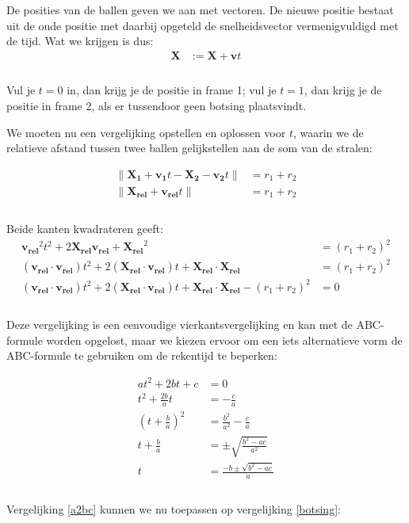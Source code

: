 \documentclass[12pt,a4paper]{article}
\begin{document}
	De posities van de ballen geven we aan met vectoren. De nieuwe positie bestaat uit de oude positie met daarbij opgeteld de snelheidsvector vermenigvuldigd met de tijd. Wat we krijgen is dus:
	\begin{equation}
		\begin{aligned}
			\mathbf{X} &:= \mathbf{X} + \mathbf{v}t\\
		\end{aligned}
	\end{equation}
	\\Vul je $t=0$ in, dan krijg je de positie in frame 1; vul je $t=1$, dan krijg je de positie in frame 2, als er tussendoor geen botsing plaatsvindt.
	
	We moeten nu een vergelijking opstellen en oplossen voor $t$, waarin we de relatieve afstand tussen twee ballen gelijkstellen aan de som van de stralen:
	
	\begin{equation}
		\begin{aligned}
			 \|\mathbf{X_1} + \mathbf{v_1}t  - \mathbf{X_2} -  \mathbf{v_2}t \| &= r_1 + r_2 \\
			 \|\mathbf{X_{rel}} + \mathbf{v_{rel}}t \| &= r_1 + r_2\\
		\end{aligned}
	\end{equation}
	\\Beide kanten kwadrateren geeft:
	\begin{equation}
		\label{botsing}
		\begin{aligned}
			\mathbf{v_{rel}}^2 t^2 + 2 \mathbf{X_{rel}} \mathbf{v_{rel}} + \mathbf{X_{rel}}^2  &= (r_1 + r_2)^2 \\
			(\mathbf{v_{rel}} \cdot \mathbf{v_{rel}})t^2 + 2(\mathbf{X_{rel}} \cdot \mathbf{v_{rel}})t + \mathbf{X_{rel}} \cdot \mathbf{X_{rel}} &= (r_1 + r_2)^2 \\
			(\mathbf{v_{rel}} \cdot \mathbf{v_{rel}})t^2 + 2(\mathbf{X_{rel}} \cdot \mathbf{v_{rel}})t + \mathbf{X_{rel}} \cdot \mathbf{X_{rel}} - (r_1 + r_2)^2 &= 0\\
		\end{aligned}
	\end{equation}
	\\Deze vergelijking is een eenvoudige vierkantsvergelijking en kan met de ABC-formule worden opgelost, maar we kiezen ervoor om een iets alternatieve vorm de ABC-formule te gebruiken om de rekentijd te beperken:
	
	\begin{equation}
		\label{a2bc}
		\begin{aligned}
			at^2+2bt+c &= 0 \\
			t^2+\tfrac{2b}{a}t &= -\frac{c}{a} \\
			\left( t+\tfrac{b}{a} \right)^2 &= \frac{b^2}{a^2} -\frac{c}{a} \\
			t + \tfrac{b}{a} &= \pm \sqrt{\frac{b^2 - ac}{a^2}} \\
			t &= \frac{-b \pm \sqrt{b^2 - ac}}{a}\\
		\end{aligned}
	\end{equation}
	\\Vergelijking \eqref{a2bc} kunnen we nu toepassen op vergelijking \eqref{botsing}:
	
\end{document}
